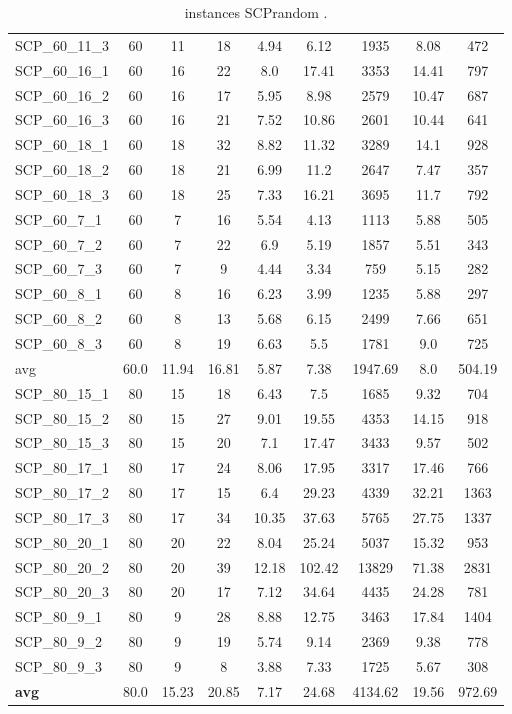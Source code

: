 \begin{table}[!ht]
{\begin{tabular}{lcccccccc}
SCP\_60\_11\_3 & 60 & 11 & 18 & 4.94 & 6.12 & 1935 & 8.08 & 472 \\
SCP\_60\_16\_1 & 60 & 16 & 22 & 8.0 & 17.41 & 3353 & 14.41 & 797 \\
SCP\_60\_16\_2 & 60 & 16 & 17 & 5.95 & 8.98 & 2579 & 10.47 & 687 \\
SCP\_60\_16\_3 & 60 & 16 & 21 & 7.52 & 10.86 & 2601 & 10.44 & 641 \\
SCP\_60\_18\_1 & 60 & 18 & 32 & 8.82 & 11.32 & 3289 & 14.1 & 928 \\
SCP\_60\_18\_2 & 60 & 18 & 21 & 6.99 & 11.2 & 2647 & 7.47 & 357 \\
SCP\_60\_18\_3 & 60 & 18 & 25 & 7.33 & 16.21 & 3695 & 11.7 & 792 \\
SCP\_60\_7\_1 & 60 & 7 & 16 & 5.54 & 4.13 & 1113 & 5.88 & 505 \\
SCP\_60\_7\_2 & 60 & 7 & 22 & 6.9 & 5.19 & 1857 & 5.51 & 343 \\
SCP\_60\_7\_3 & 60 & 7 & 9 & 4.44 & 3.34 & 759 & 5.15 & 282 \\
SCP\_60\_8\_1 & 60 & 8 & 16 & 6.23 & 3.99 & 1235 & 5.88 & 297 \\
SCP\_60\_8\_2 & 60 & 8 & 13 & 5.68 & 6.15 & 2499 & 7.66 & 651 \\
SCP\_60\_8\_3 & 60 & 8 & 19 & 6.63 & 5.5 & 1781 & 9.0 & 725 \\
\hline avg & 60.0 & 11.94 & 16.81& 5.87 & 7.38& 1947.69 & 8.0& 504.19\\ \hline
SCP\_80\_15\_1 & 80 & 15 & 18 & 6.43 & 7.5 & 1685 & 9.32 & 704 \\
SCP\_80\_15\_2 & 80 & 15 & 27 & 9.01 & 19.55 & 4353 & 14.15 & 918 \\
SCP\_80\_15\_3 & 80 & 15 & 20 & 7.1 & 17.47 & 3433 & 9.57 & 502 \\
SCP\_80\_17\_1 & 80 & 17 & 24 & 8.06 & 17.95 & 3317 & 17.46 & 766 \\
SCP\_80\_17\_2 & 80 & 17 & 15 & 6.4 & 29.23 & 4339 & 32.21 & 1363 \\
SCP\_80\_17\_3 & 80 & 17 & 34 & 10.35 & 37.63 & 5765 & 27.75 & 1337 \\
SCP\_80\_20\_1 & 80 & 20 & 22 & 8.04 & 25.24 & 5037 & 15.32 & 953 \\
SCP\_80\_20\_2 & 80 & 20 & 39 & 12.18 & 102.42 & 13829 & 71.38 & 2831 \\
SCP\_80\_20\_3 & 80 & 20 & 17 & 7.12 & 34.64 & 4435 & 24.28 & 781 \\
SCP\_80\_9\_1 & 80 & 9 & 28 & 8.88 & 12.75 & 3463 & 17.84 & 1404 \\
SCP\_80\_9\_2 & 80 & 9 & 19 & 5.74 & 9.14 & 2369 & 9.38 & 778 \\
SCP\_80\_9\_3 & 80 & 9 & 8 & 3.88 & 7.33 & 1725 & 5.67 & 308 \\
\hline \textbf{avg} & 80.0 & 15.23 & 20.85 & 7.17 & 24.68 & 4134.62 & 19.56 & 972.69 \\ \hline
\bottomrule
\end{tabular}
}%
\caption{ instances SCPrandom .}
\label{tab:table_compareBB_SCPrandom }
\end{table}
